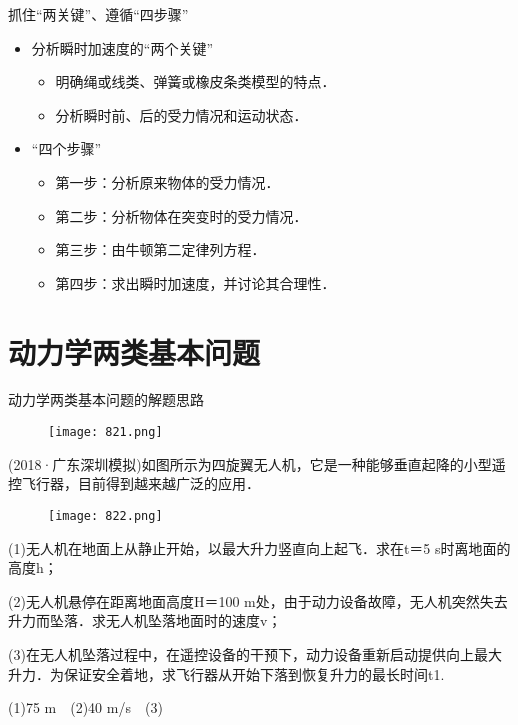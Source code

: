 \documentclass[cn,11pt]{elegantbook}
\begin{document}
\begin{note}
   抓住“两关键”、遵循“四步骤”
   \begin{itemize}
      \item 分析瞬时加速度的“两个关键”
      \begin{itemize}
         \item 明确绳或线类、弹簧或橡皮条类模型的特点．
         \item 分析瞬时前、后的受力情况和运动状态．
      \end{itemize}
      \item “四个步骤”
      \begin{itemize}
         \item 第一步：分析原来物体的受力情况．
         \item 第二步：分析物体在突变时的受力情况．
         \item 第三步：由牛顿第二定律列方程．
         \item 第四步：求出瞬时加速度，并讨论其合理性．
      \end{itemize}
   \end{itemize}
   
\end{note}




\section{动力学两类基本问题}
\begin{note}
   动力学两类基本问题的解题思路
   \begin{figure}[htbp]
      \centering
      \texttt{[image: 821.png]}
   \end{figure}
   
\end{note}

\begin{example}
   (2018·广东深圳模拟)如图所示为四旋翼无人机，它是一种能够垂直起降的小型遥控飞行器，目前得到越来越广泛的应用．      
   \begin{figure}[htbp]
      \centering
      \texttt{[image: 822.png]}
   \end{figure}
   (1)无人机在地面上从静止开始，以最大升力竖直向上起飞．求在t＝5 s时离地面的高度h；
   
   (2)无人机悬停在距离地面高度H＝100 m处，由于动力设备故障，无人机突然失去升力而坠落．求无人机坠落地面时的速度v；
  
   (3)在无人机坠落过程中，在遥控设备的干预下，动力设备重新启动提供向上最大升力．为保证安全着地，求飞行器从开始下落到恢复升力的最长时间t1.
   \begin{solution}
      (1)75 m　(2)40 m/s　(3)
      
   \end{solution}
\end{example}
\end{document}

